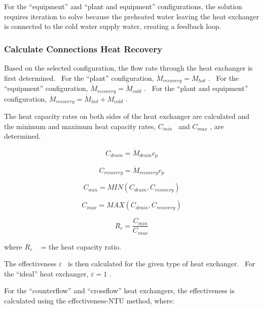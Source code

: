 For the ``equipment'' and ``plant and equipment'' configurations, the solution requires iteration to solve because the preheated water leaving the heat exchanger is connected to the cold water supply water, creating a feedback loop.

\subsubsection{Calculate Connections Heat Recovery}\label{calculate-connections-heat-recovery}

Based on the selected configuration, the flow rate through the heat exchanger is first determined.~ For the ``plant'' configuration, \({\dot M_{recovery}} = {\dot M_{hot}}\) .~ For the ``equipment'' configuration, \({\dot M_{recovery}} = {\dot M_{cold}}\) .~ For the ``plant and equipment'' configuration, \({\dot M_{recovery}} = {\dot M_{hot}} + {\dot M_{cold}}\) .

The heat capacity rates on both sides of the heat exchanger are calculated and the minimum and maximum heat capacity rates, \({C_{min}}\) ~and \({C_{max}}\) , are determined.

\begin{equation}
{C_{drain}} = {\dot M_{drain}}{c_p}
\end{equation}

\begin{equation}
{C_{recovery}} = {\dot M_{recovery}}{c_p}
\end{equation}

\begin{equation}
{C_{min}} = MIN({C_{drain}},{C_{recovery}})
\end{equation}

\begin{equation}
{C_{max}} = MAX({C_{drain}},{C_{recovery}})
\end{equation}

\begin{equation}
{R_c} = \frac{{{C_{min}}}}{{{C_{max}}}}
\end{equation}

where \({R_c}\) ~ = the heat capacity ratio.

The effectiveness \(\varepsilon\) ~is then calculated for the given type of heat exchanger.~ For the ``ideal'' heat exchanger, \(\varepsilon = 1\) .

For the ``counterflow'' and ``crossflow'' heat exchangers, the effectiveness is calculated using the effectiveness-NTU method, where:

